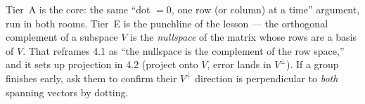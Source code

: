 \documentclass[10pt]{article}
\begin{document}
\begin{teachernote}
Tier~A is the core: the same ``dot $=0$, one row (or column) at a time'' argument, run in both rooms.
Tier~E is the punchline of the lesson --- the orthogonal complement of a subspace $V$ is the
\emph{nullspace} of the matrix whose rows are a basis of $V$. That reframes 4.1 as ``the nullspace is
the complement of the row space,'' and it sets up projection in 4.2 (project onto $V$, error lands in
$V^{\perp}$). If a group finishes early, ask them to confirm their $V^{\perp}$ direction is perpendicular
to \emph{both} spanning vectors by dotting.
\end{teachernote}
\end{document}
